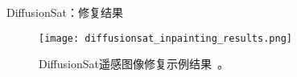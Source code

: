   \begin{refsection}
  \begin{frame}{DiffusionSat：修复结果}
    \begin{figure}
      \centering
      \texttt{[image: diffusionsat\_inpainting\_results.png]}
      \caption[]{\scriptsize DiffusionSat遥感图像修复示例结果~\parencite{diffusionset2024}。}
    \end{figure}
    \bottomleftrefs
  \end{frame}
  \end{refsection}
